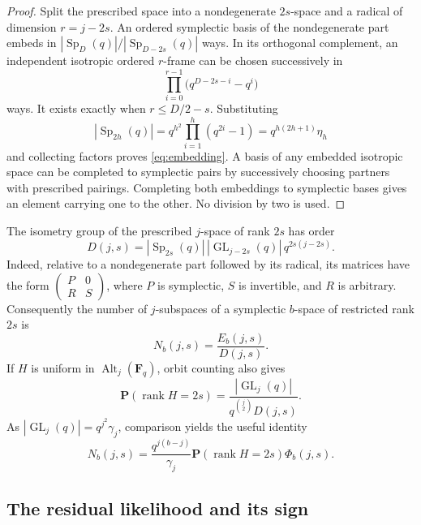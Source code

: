 \documentclass[11pt,letterpaper]{article}
\theoremstyle{remark}
\newcommand{\F}{\mathbf F}
\newcommand{\Prob}{\mathbf P}
\newcommand{\Alt}{\operatorname{Alt}}
\newcommand{\GL}{\operatorname{GL}}
\newcommand{\Sp}{\operatorname{Sp}}
\newcommand{\rank}{\operatorname{rank}}
\begin{document}
\begin{proof}
Split the prescribed space into a nondegenerate $2s$-space and a radical of
dimension $r=j-2s$. An ordered symplectic basis of the nondegenerate part
embeds in $|\Sp_D(q)|/|\Sp_{D-2s}(q)|$ ways. In its orthogonal complement,
an independent isotropic ordered $r$-frame can be chosen successively in
\[
 \prod_{i=0}^{r-1}\bigl(q^{D-2s-i}-q^i\bigr)
\]
ways. It exists exactly when $r\le D/2-s$. Substituting
\[
 |\Sp_{2h}(q)|=q^{h^2}\prod_{i=1}^h(q^{2i}-1)
             =q^{h(2h+1)}\eta_h
\]
and collecting factors proves \eqref{eq:embedding}. A basis of any
embedded isotropic space can be completed to symplectic pairs by successively
choosing partners with prescribed pairings. Completing both embeddings to
symplectic bases gives an element carrying one to the other.
No division by two is used.
\end{proof}

The isometry group of the prescribed $j$-space of rank $2s$ has order
\begin{equation}\label{eq:aut}
 D(j,s)=|\Sp_{2s}(q)|\,|\GL_{j-2s}(q)|\,q^{2s(j-2s)}.
\end{equation}
Indeed, relative to a nondegenerate part followed by its radical, its
matrices have the form
$\left(\begin{smallmatrix}P&0\\R&S\end{smallmatrix}\right)$,
where $P$ is symplectic, $S$ is invertible, and $R$ is arbitrary.
Consequently the number of $j$-subspaces of a symplectic $b$-space of
restricted rank $2s$ is
\begin{equation}\label{eq:N}
 N_b(j,s)=\frac{E_b(j,s)}{D(j,s)}.
\end{equation}
If $H$ is uniform in $\Alt_j(\F_q)$, orbit counting also gives
\begin{equation}\label{eq:H}
 \Prob(\rank H=2s)=\frac{|\GL_j(q)|}{q^{\binom j2}D(j,s)}.
\end{equation}
As $|\GL_j(q)|=q^{j^2}\gamma_j$, comparison yields the useful identity
\begin{equation}\label{eq:N-averaging}
 N_b(j,s)=\frac{q^{j(b-j)}}{\gamma_j}
             \Prob(\rank H=2s)\Phi_b(j,s).
\end{equation}

\subsection{The residual likelihood and its sign}
\end{document}
